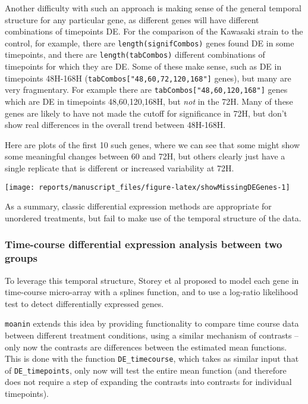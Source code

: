 \documentclass[9pt,a4paper,]{extarticle}
\begin{document}
Another difficulty with such an approach is making sense of the general
temporal structure for any particular gene, as different genes will have
different combinations of timepoints DE. For the comparison of the Kawasaki
strain to the control, for example, there are \texttt{length(signifCombos)} genes
found DE in some timepoints, and there are \texttt{length(tabCombos)} different
combinations of timepoints for which they are DE. Some of these make sense,
such as DE in timepoints 48H-168H (\texttt{tabCombos{[}"48,60,72,120,168"{]}} genes), but
many are very fragmentary. For example there are \texttt{tabCombos{[}"48,60,120,168"{]}}
genes which are DE in timepoints 48,60,120,168H, but \emph{not} in the 72H. Many of
these genes are likely to have not made the cutoff for significance in 72H,
but don't show real differences in the overall trend between 48H-168H.

Here are plots of the first 10 such genes, where we can see that some might
show some meaningful changes between 60 and 72H, but others clearly just have
a single replicate that is different or increased variability at 72H.

\begin{center}\texttt{[image: reports/manuscript\_files/figure-latex/showMissingDEGenes-1]} \end{center}

As a summary, classic differential expression methods are appropriate for
unordered treatments, but fail to make use of the temporal structure of the data.

\hypertarget{time-course-differential-expression-analysis-between-two-groups}{%
\subsubsection{Time-course differential expression analysis between two groups}\label{time-course-differential-expression-analysis-between-two-groups}}

To leverage this temporal structure, Storey et al \citep{storey:significance}
proposed to model each gene in time-course micro-array with a splines
function, and to use a log-ratio likelihood test to detect differentially
expressed genes.

\texttt{moanin} extends this idea by providing functionality to compare time course
data between different treatment conditions, using a similar mechanism of
contrasts -- only now the contrasts are differences between the estimated mean
functions. This is done with the function \texttt{DE\_timecourse}, which takes as
similar input that of \texttt{DE\_timepoints}, only now will test the entire mean
function (and therefore does not require a step of expanding the contrasts
into contrasts for individual timepoints).
\end{document}
